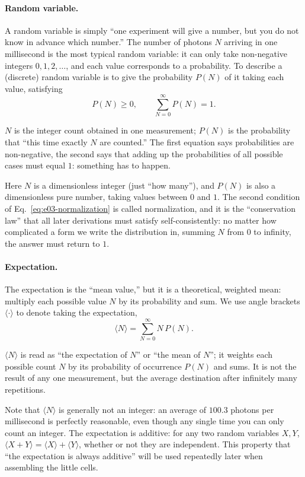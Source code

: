 \paragraph{Random variable.}
A random variable is simply ``one experiment will give a number, but you do not know in advance which number.'' The number of photons $N$ arriving in one millisecond is the most typical random variable: it can only take non-negative integers $0,1,2,\dots$, and each value corresponds to a probability. To describe a (discrete) random variable is to give the probability $P(N)$ of it taking each value, satisfying
\begin{equation}
  P(N)\ge 0,\qquad \sum_{N=0}^{\infty}P(N)=1 .
  \label{eq:e03-normalization}
\end{equation}
\begin{formulaexplain}
$N$ is the integer count obtained in one measurement; $P(N)$ is the probability that ``this time exactly $N$ are counted.'' The first equation says probabilities are non-negative, the second says that adding up the probabilities of all possible cases must equal $1$: something has to happen.
\end{formulaexplain}
Here $N$ is a dimensionless integer (just ``how many''), and $P(N)$ is also a dimensionless pure number, taking values between $0$ and $1$. The second condition of Eq.~\eqref{eq:e03-normalization} is called normalization, and it is the ``conservation law'' that all later derivations must satisfy self-consistently: no matter how complicated a form we write the distribution in, summing $N$ from $0$ to infinity, the answer must return to $1$.

\paragraph{Expectation.}
The expectation is the ``mean value,'' but it is a theoretical, weighted mean: multiply each possible value $N$ by its probability and sum. We use angle brackets $\langle\cdot\rangle$ to denote taking the expectation,
\begin{equation}
  \langle N\rangle=\sum_{N=0}^{\infty}N\,P(N).
  \label{eq:e03-expectation}
\end{equation}
\begin{formulaexplain}
$\langle N\rangle$ is read as ``the expectation of $N$'' or ``the mean of $N$''; it weights each possible count $N$ by its probability of occurrence $P(N)$ and sums. It is not the result of any one measurement, but the average destination after infinitely many repetitions.
\end{formulaexplain}
Note that $\langle N\rangle$ is generally not an integer: an average of $100.3$ photons per millisecond is perfectly reasonable, even though any single time you can only count an integer. The expectation is additive: for any two random variables $X,Y$, $\langle X+Y\rangle=\langle X\rangle+\langle Y\rangle$, whether or not they are independent. This property that ``the expectation is always additive'' will be used repeatedly later when assembling the little cells.

